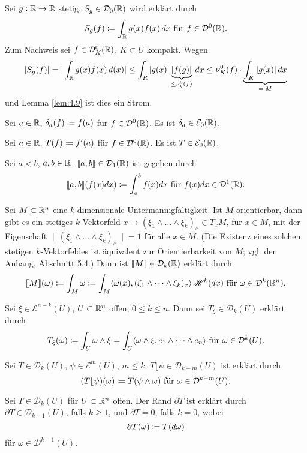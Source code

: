 \documentclass[a4paper,twoside,DIV15,BCOR12mm]{scrbook}
\newcommand{\HM}{\mathscr H}
\newcommand{\MR}{\lfloor}
\begin{document}
\begin{beispiele}
\item Sei $g:\mathbb{R}\to \mathbb{R}$ stetig. $S_g \in \mathcal D_0(\mathbb{R})$ wird erklärt durch
\[
S_g(f) \da \int_\MdR g(x)f(x)\, dx\text{ für } f\in \mathcal D^0(\MdR).
\]
Zum Nachweis sei $f\in \mathcal{D}_K^0(\mathbb{R})$, $K\subset U$ kompakt. Wegen
\[
|S_g(f)| = |\int_\MdR g(x) f(x) \, d(x)| \le \int_R |g(x)|\underbrace{|f(g)|}_{\le \nu_k^0(f)} \, dx \le \nu_K^0(f) \cdot \underbrace{\int_K |g(x)|\, dx}_{\ad M}\]
und Lemma \ref{lem:4.9} ist dies ein Strom.
\item Sei $a\in\mathbb{R}$, $\delta_a(f) \da f(a)$ für $f\in \mathcal D^0(\mathbb{R})$. Es ist $\delta_a\in\mathcal E_0(\mathbb{R})$.
\item Sei $a\in\mathbb{R}$, $T(f) \da f'(a)$ für $f\in\mathcal D^0(\mathbb{R})$. Es ist $T\in \mathcal E_0(\mathbb{R})$.
\item Sei $a< b$, $a,b\in\mathbb{R}$. $\llbracket a,b\rrbracket \in \mathcal D_1(\mathbb{R})$ ist gegeben durch
\[
\llbracket a,b\rrbracket(f(x)dx) \da \int_a^b f(x) dx \text{ für } f(x)dx \in \mathcal D^1(\MdR).
\]
\item Sei $M\subset\mathbb{R}^n$ eine $k$-dimensionale Untermannigfaltigkeit. Ist $M$ orientierbar, dann gibt es ein stetiges $k$-Vektorfeld $x\mapsto (\xi_1\wedge\dots\wedge \xi_k)_x\in T_xM$, für $x\in M$, mit der Eigenschaft $\|(\xi_1\wedge\dots\wedge\xi_k)_x\|=1$ für alle $x\in M$. (Die Existenz eines solchen stetigen $k$-Vektorfeldes ist äquivalent zur Orientierbarkeit von $M$; vgl. den Anhang, Abschnitt 5.4.) Dann ist $\llbracket M\rrbracket \in \mathcal D_k(\mathbb{R})$ erklärt durch
\[
\llbracket M \rrbracket(\omega) \da \int_M \omega \da \int_M \langle \omega(x), (\xi_1\wedge\dots\wedge \xi_k)_x\rangle \,\HM^k(dx) \text{ für } \omega \in \mathcal D^k(\MdR^n).
\]
\item Sei $\xi\in\mathcal E^{n-k}(U)$, $U\subset \mathbb{R}^n$ offen, $0\le k \le n$. Dann sei $T_\xi \in \mathcal D_k(U)$ erklärt durch
\[
T_\xi(\omega) \da \int_U \omega\wedge\xi = \int_U \langle \omega\wedge \xi, e_1\wedge\dots\wedge e_n\rangle  \text{ für }\omega \in \mathcal D^k(U).
\]
\item Sei $T\in \mathcal D_k(U)$, $\psi\in\mathcal E^m(U)$, $m\le k$. $T\MR \psi \in \mathcal D_{k-m}(U)$ ist erklärt durch
\[
(T\MR \psi)(\omega) \da T(\psi \wedge \omega) \text{ für } \omega \in \mathcal D^{k-m}(U).
\]
\end{beispiele}

\begin{definition}
Sei $T\in \mathcal D_k(U)$ für $U\subset \mathbb{R}^n$ offen. Der Rand $\partial T$ ist erklärt durch $\partial T\in \mathcal D_{k-1}(U)$, falls $k\ge 1$, und $\partial T=0$, falls $k=0$, wobei
\[
\partial T(\omega) \da T(d\omega)
\]
für $\omega\in\mathcal D^{k-1}(U)$.
\end{definition}
\end{document}

